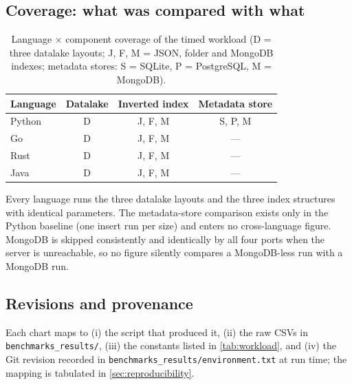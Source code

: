 \subsection{Coverage: what was compared with what}
\label{sec:coverage}

\begin{table}[htbp]
    \centering
    \caption{Language $\times$ component coverage of the timed workload
    (D = three datalake layouts; J, F, M = JSON, folder and MongoDB indexes;
    metadata stores: S = SQLite, P = PostgreSQL, M = MongoDB).}
    \label{tab:coverage}
    \begin{tabular}{@{}lccc@{}}
        \toprule
        Language & Datalake & Inverted index & Metadata store \\
        \midrule
        Python & D & J, F, M & S, P, M \\
        Go & D & J, F, M & --- \\
        Rust & D & J, F, M & --- \\
        Java & D & J, F, M & --- \\
        \bottomrule
    \end{tabular}
\end{table}

Every language runs the three datalake layouts and the three index
structures with identical parameters. The metadata-store comparison exists
only in the Python baseline (one insert run per size) and enters no
cross-language figure. MongoDB is skipped consistently and identically by all
four ports when the server is unreachable, so no figure silently compares a
MongoDB-less run with a MongoDB run.

\subsection{Revisions and provenance}
\label{sec:provenance}

Each chart maps to (i) the script that produced it, (ii) the raw CSVs in \texttt{benchmarks\_\allowbreak results/}, (iii) the constants listed in
\cref{tab:workload}, and (iv) the Git revision recorded in
\texttt{benchmarks\_\allowbreak results/\allowbreak environment.txt} at run time; the mapping is
tabulated in \cref{sec:reproducibility}.
